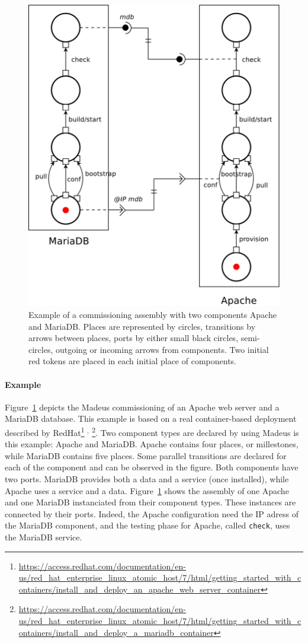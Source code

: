 \begin{figure}[tbp]
  \begin{center}
    \includegraphics[width=0.35\linewidth]{./images/apachebdd.pdf}
  \end{center}
  \caption{Example of a commissioning assembly with two components
    Apache and MariaDB. Places are represented by circles, transitions
    by arrows between places, ports by either small black circles,
    semi-circles, outgoing or incoming arrows from components. Two
    initial red tokens are placed in each initial place of
    components.}
  \label{fig:example}
\end{figure}

\paragraph{Example}{ Figure~\ref{fig:example} depicts the Madeus
  commissioning of an Apache web server and a MariaDB database. This
  example is based on a real container-based deployment described by
  RedHat\footnote{\url{https://access.redhat.com/documentation/en-us/red_hat_enterprise_linux_atomic_host/7/html/getting_started_with_containers/install_and_deploy_an_apache_web_server_container}}%
  $^,$%
  \footnote{\url{https://access.redhat.com/documentation/en-us/red_hat_enterprise_linux_atomic_host/7/html/getting_started_with_containers/install_and_deploy_a_mariadb_container}}. Two
  component types are declared by using Madeus is this example: Apache
  and MariaDB. Apache contains four places, or millestones, while
  MariaDB contains five places. Some parallel transitions are declared
  for each of the component and can be observed in the figure. Both
  components have two ports. MariaDB provides both a data and a
  service (once installed), while Apache uses a service and a
  data. Figure~\ref{fig:example} shows the assembly of one Apache and
  one MariaDB instanciated from their component types. These instances
  are connected by their ports. Indeed, the Apache configuration need
  the IP adress of the MariaDB component, and the testing phase for
  Apache, called \texttt{check}, uses the MariaDB service.}


